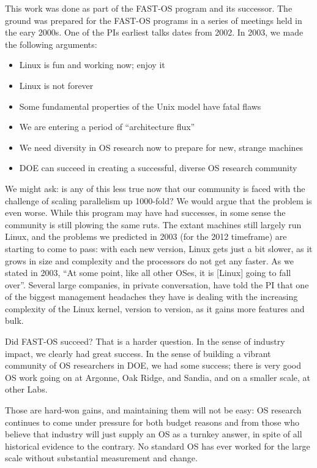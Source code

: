 \documentclass{report}
\begin{document}
This work was done as part of the FAST-OS program and its successor. 
The ground was prepared for the FAST-OS programs in a series of meetings held in
the eary 2000s. One of the PIs earliest talks dates from 2002. In 2003, we made
the following arguments: 
\begin{itemize}
\item Linux is fun and working now; enjoy it
\item Linux is not forever
\item Some fundamental properties of the Unix model have fatal flaws
\item We are entering a period of “architecture flux” 
\item We need diversity in OS research now to prepare for new, strange machines
\item DOE can succeed in creating a successful, diverse OS research community
\end{itemize}

We might ask: is any of this less true now that our community is faced with 
the challenge of scaling parallelism up 1000-fold? We would argue that 
the problem is even worse. While this program may have had successes, in some 
sense the community is 
still plowing the same ruts. The extant machines still largely run Linux, and the 
problems we predicted in 2003 (for the 2012 timeframe) are starting to 
come to pass: with each new version, Linux gets just a bit slower, as it grows in size 
and complexity and the processors do not get any faster. As we stated in 2003, 
``At some point, like all other OSes, it is [Linux] going to fall over''. 
Several large companies, in private conversation, have told the PI that one of the
biggest management headaches they have is dealing with the increasing complexity of 
the Linux kernel, version to version, as it gains more features and bulk.  

Did FAST-OS succeed? That is a harder question. In the sense of industry impact, we 
clearly had great success. In the sense of building a vibrant community of OS researchers
in DOE, we had some success; there is very good OS work going on at Argonne, Oak Ridge, 
and Sandia, and on a smaller scale, at other Labs. 

Those are hard-won gains, and maintaining them 
will not be easy: OS research continues to come under 
pressure for both budget reasons and 
from those who believe that industry will just supply an OS as a turnkey 
answer, in spite of all historical evidence to the contrary. No standard OS has ever worked
for the large scale without substantial measurement and change. 
\end{document}
